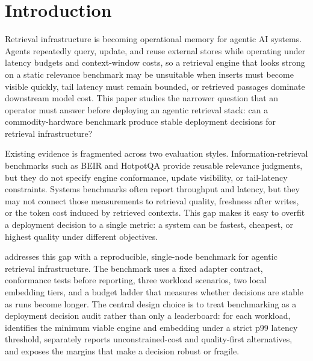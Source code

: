 \section{Introduction}

Retrieval infrastructure is becoming operational memory for agentic AI systems. Agents repeatedly query, update, and reuse external stores while operating under latency budgets and context-window costs, so a retrieval engine that looks strong on a static relevance benchmark may be unsuitable when inserts must become visible quickly, tail latency must remain bounded, or retrieved passages dominate downstream model cost. This paper studies the narrower question that an operator must answer before deploying an agentic retrieval stack: can a commodity-hardware benchmark produce stable deployment decisions for retrieval infrastructure?

Existing evidence is fragmented across two evaluation styles. Information-retrieval benchmarks such as BEIR \citep{thakur2021beir} and HotpotQA \citep{yang2018hotpotqa} provide reusable relevance judgments, but they do not specify engine conformance, update visibility, or tail-latency constraints. Systems benchmarks often report throughput and latency, but they may not connect those measurements to retrieval quality, freshness after writes, or the token cost induced by retrieved contexts. This gap makes it easy to overfit a deployment decision to a single metric: a system can be fastest, cheapest, or highest quality under different objectives.

\sys addresses this gap with a reproducible, single-node benchmark for agentic retrieval infrastructure. The benchmark uses a fixed adapter contract, conformance tests before reporting, three workload scenarios, two local embedding tiers, and a budget ladder that measures whether decisions are stable as runs become longer. The central design choice is to treat benchmarking as a deployment decision audit rather than only a leaderboard: for each workload, \sys identifies the minimum viable engine and embedding under a strict p99 latency threshold, separately reports unconstrained-cost and quality-first alternatives, and exposes the margins that make a decision robust or fragile.

